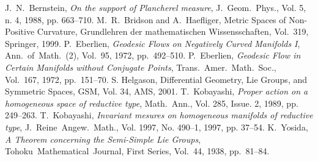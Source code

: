 \documentclass[12pt,dvipdfmx,uplatex]{jsarticle}
\begin{document}
\clearpage
\begin{thebibliography}{99}
  \vspace{-0.5em}
 J.~N.~Bernstein, \textit{On the support of Plancherel measure}, J.~Geom.~Phys., Vol. 5, n. 4, 1988, pp. 663--710.
 M.~R.~Bridson and A.~Haefliger, Metric Spaces of Non-Positive Curvature, Grundlehren der mathematischen Wissensschaften, Vol.~319, Springer, 1999.
 P.~Eberlien, \textit{Geodesic Flows on Negatively Curved Manifolds I}, Ann.~of~Math.~(2), Vol.~95, 1972, pp.~492--510.
 P.~Eberlien, \textit{Geodesic Flow in Certain Manifolds without Conjugate Points}, Trans.~Amer.~Math.~Soc., Vol.~167, 1972, pp.~151--70.
 S. Helgason, Differential Geometry, Lie Groups, and Symmetric Spaces, GSM, Vol. 34, AMS, 2001.
 T.~Kobayashi, 
  \textit{Proper action on a homogeneous space of reductive type},
  Math.~Ann., Vol. 285, Issue. 2, 1989, pp. 249--263.  
 T.~Kobayashi, \textit{Invariant mesures on homogeneous manifolds of reductive type}, J.~Reine~Angew.~Math., Vol. 1997, No. 490--1, 1997, pp. 37--54.
 K.~Yosida, \textit{A Theorem concerning the Semi-Simple Lie Groups}, \\Tohoku~Mathematical~Journal, First Series, Vol.~44, 1938, pp.~81--84.
\end{thebibliography}
\end{document}
